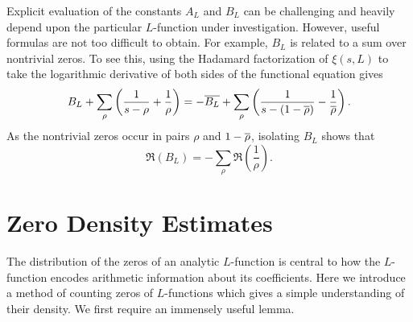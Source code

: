     Explicit evaluation of the constants \(A_{L}\) and \(B_{L}\) can be challenging and heavily depend upon the particular \(L\)-function under investigation. However, useful formulas are not too difficult to obtain. For example, \(B_{L}\) is related to a sum over nontrivial zeros. To see this, using the Hadamard factorization of \(\xi(s,L)\) to take the logarithmic derivative of both sides of the functional equation gives
    \[
      B_{L}+\sum_{\rho}\left(\frac{1}{s-\rho}+\frac{1}{\rho}\right) = -\overline{B_{L}}+\sum_{\rho}\left(\frac{1}{s-(1-\overline{\rho})}-\frac{1}{\overline{\rho}}\right).
    \]
    As the nontrivial zeros occur in pairs \(\rho\) and \(1-\overline{\rho}\), isolating \(B_{L}\) shows that
    \begin{equation}\label{equ:B_L_real_part}
      \Re(B_{L}) = -\sum_{\rho}\Re\left(\frac{1}{\rho}\right).
    \end{equation}
  \section{Zero Density Estimates}
    The distribution of the zeros of an analytic \(L\)-function is central to how the \(L\)-function encodes arithmetic information about its coefficients. Here we introduce a method of counting zeros of \(L\)-functions which gives a simple understanding of their density. We first require an immensely useful lemma.


